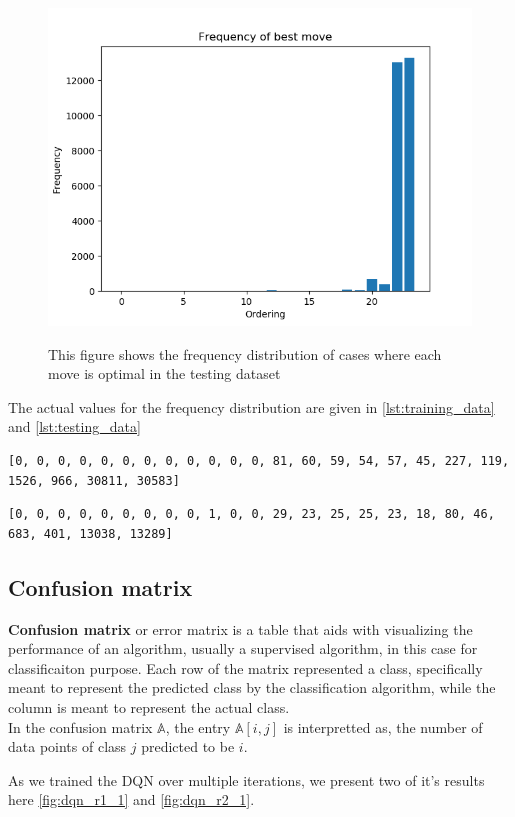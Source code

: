 \begin{figure}
\centering
\includegraphics[scale=0.75]{testingb1.png}\\
\caption{This figure shows the frequency distribution of cases where each move is optimal in the testing dataset}
\label{fig:testingb1}
\end{figure}

The actual values for the frequency distribution are given in \ref{lst:training_data} and \ref{lst:testing_data}

\begin{lstlisting}[caption= Frequencies of optimal move in training data, label={lst:training_data}]
[0, 0, 0, 0, 0, 0, 0, 0, 0, 0, 0, 0, 81, 60, 59, 54, 57, 45, 227, 119, 1526, 966, 30811, 30583]
\end{lstlisting}
\begin{lstlisting}[caption= Frequencies of optimal move in testing data, label={lst:testing_data}]
[0, 0, 0, 0, 0, 0, 0, 0, 0, 1, 0, 0, 29, 23, 25, 25, 23, 18, 80, 46, 683, 401, 13038, 13289]
\end{lstlisting}


\subsection{Confusion matrix}
\textbf{Confusion matrix} or error matrix is a table that aids with visualizing the performance of an algorithm, usually a supervised algorithm, in this case for classificaiton purpose. Each row of the matrix represented a class, specifically meant to represent the predicted class by the classification algorithm, while the column is meant to represent the actual class. \\
In the confusion matrix $\mathbb{A}$, the entry $\mathbb{A}[i,j]$ is interpretted as, the number of data points of class $j$ predicted to be $i$.
\par As we trained the DQN over multiple iterations, we present two of it's results here \ref{fig:dqn_r1_1} and \ref{fig:dqn_r2_1}.

